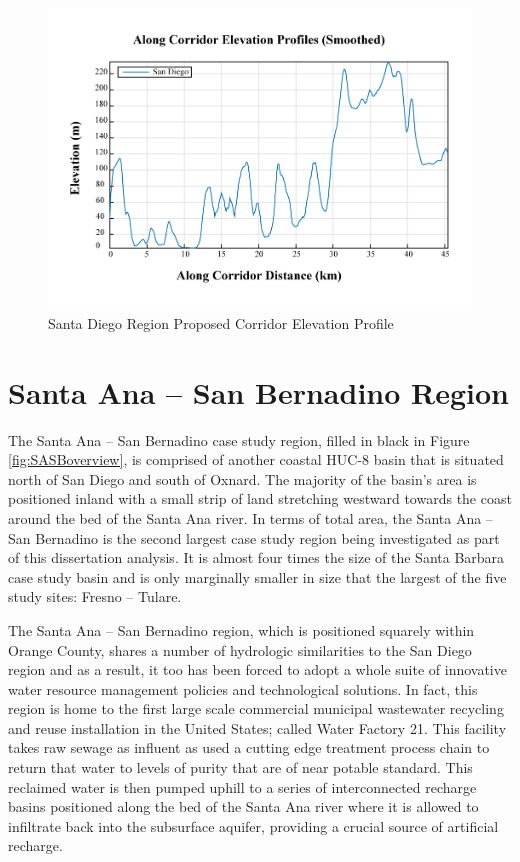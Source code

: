         \begin{figure}[!h]
            \begin{center}
            \includegraphics[width=5.5in]{figures/SanDiego_Elevation_Profile.png}   
            \caption{Santa Diego Region Proposed Corridor Elevation Profile}
            \label{fig:SDelevationProfile}
            \end{center}
        \end{figure}

\clearpage

\section{Santa Ana -- San Bernadino Region}

The Santa Ana -- San Bernadino case study region, filled in black in Figure \ref{fig:SASBoverview}, is comprised of another coastal HUC-8 basin that is situated north of San Diego and south of Oxnard. The majority of the basin's area is positioned inland with a small strip of land stretching westward towards the coast around the bed of the Santa Ana river. In terms of total area, the Santa Ana -- San Bernadino is the second largest case study region being investigated as part of this dissertation analysis. It is almost four times the size of the Santa Barbara case study basin and is only marginally smaller in size that the largest of the five study sites: Fresno -- Tulare.

The Santa Ana -- San Bernadino region, which is positioned squarely within Orange County, shares a number of hydrologic similarities to the San Diego region and as a result, it too has been forced to adopt a whole suite of innovative water resource management policies and technological solutions. In fact, this region is home to the first large scale commercial municipal wastewater recycling and reuse installation in the United States; called Water Factory 21. This facility takes raw sewage as influent as used a cutting edge treatment process chain to return that water to levels of purity that are of near potable standard. This reclaimed water is then pumped uphill to a series of interconnected recharge basins positioned along the bed of the Santa Ana river where it is allowed to infiltrate back into the subsurface aquifer, providing a crucial source of artificial recharge.

